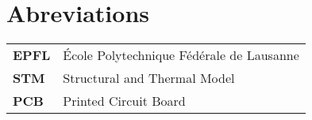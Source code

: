 \section*{Abreviations}

\begin{table}[htbp]
    {\renewcommand{\arraystretch}{1.4}
            \renewcommand{\tabcolsep}{0.2cm}
    \begin{tabular}{>{\bfseries}l l}
    EPFL & École Polytechnique Fédérale de Lausanne\\
    STM  & Structural and Thermal Model\\
    PCB  & Printed Circuit Board\\
    \end{tabular}}%
\end{table}%